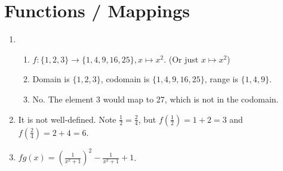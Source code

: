 \section{Functions / Mappings}
\begin{enumerate}
    \item \begin{enumerate}[label=(\roman*)]
        \item $f: \{1, 2, 3\} \to \{1, 4, 9, 16, 25\}, x \mapsto x^2$. (Or just $x \mapsto x^2$)
        \item Domain is $\{1, 2, 3\}$, codomain is $\{1, 4, 9, 16, 25\}$, range is $\{1, 4, 9\}$.
        \item No. The element 3 would map to 27, which is not in the codomain.
    \end{enumerate}
    
    \item It is not well-defined. Note $\frac 12 = \frac 24$, but $f(\frac12) = 1 + 2 = 3$ and $f(\frac24) = 2 + 4 = 6$.
    
    \item $fg(x) = \left(\frac1{x^2+1}\right)^2 - \frac1{x^2+1} + 1$.
    

\end{enumerate}
